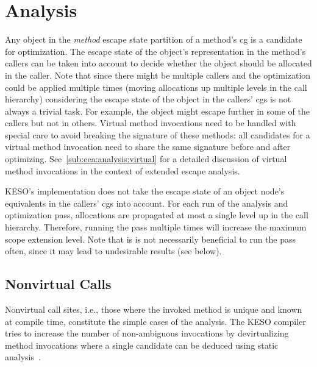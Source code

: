 	\section{Analysis}
		\label{sec:eea:analysis}
		Any object in the \emph{method} escape state partition of a method's \gls{cg} is a candidate for optimization. The
		escape state of the object's representation in the method's callers can be taken into account to decide whether the
		object should be allocated in the caller. Note that since there might be multiple callers and the optimization could
		be applied multiple times (moving allocations up multiple levels in the call hierarchy) considering the escape state
		of the object in the callers' \glspl{cg} is not always a trivial task. For example, the object might escape further
		in some of the callers but not in others. Virtual method invocations need to be handled with special care to avoid
		breaking the signature of these methods: all candidates for a virtual method invocation need to share the same
		signature before and after optimizing. See~\cref{sub:eea:analysis:virtual} for a detailed discussion of virtual
		method invocations in the context of extended escape analysis.

		KESO's implementation does not take the escape state of an object node's equivalents in the callers' \glspl{cg} into
		account. For each run of the analysis and optimization pass, allocations are propagated at most a single level up in
		the call hierarchy. Therefore, running the pass multiple times will increase the maximum scope extension level. Note
		that is is not necessarily beneficial to run the pass often, since it may lead to undesirable results (see
		below).


		\subsection{Nonvirtual Calls}
			\label{sub:eea:analysis:nonvirtual}
			Nonvirtual call sites, i.e., those where the invoked method is unique and known at compile time, constitute the
			simple cases of the analysis. The KESO compiler tries to increase the number of non-ambiguous invocations by
			devirtualizing method invocations where a single candidate can be deduced using static
			analysis~\cite[Sec.~3.4]{erhardt:11:jtres}.

